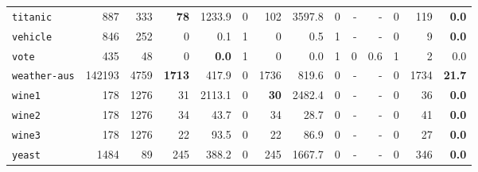 \begin{tabular}{lccrrrrrrrrrrr}
\texttt{titanic} & \multicolumn{1}{r}{887} & \multicolumn{1}{r}{333}  & \textbf{78} & 1233.9 & 0 & 102 & 3597.8 & 0 & - & - & 0 & 119 & \textbf{0.0}\\
\texttt{vehicle} & \multicolumn{1}{r}{846} & \multicolumn{1}{r}{252}  & 0 & 0.1 & 1 & 0 & 0.5 & 1 & - & - & 0 & 9 & \textbf{0.0}\\
\texttt{vote} & \multicolumn{1}{r}{435} & \multicolumn{1}{r}{48}  & 0 & \textbf{0.0} & 1 & 0 & 0.0 & 1 & 0 & 0.6 & 1 & 2 & 0.0\\
\texttt{weather-aus} & \multicolumn{1}{r}{142193} & \multicolumn{1}{r}{4759}  & \textbf{1713} & 417.9 & 0 & 1736 & 819.6 & 0 & - & - & 0 & 1734 & \textbf{21.7}\\
\texttt{wine1} & \multicolumn{1}{r}{178} & \multicolumn{1}{r}{1276}  & 31 & 2113.1 & 0 & \textbf{30} & 2482.4 & 0 & - & - & 0 & 36 & \textbf{0.0}\\
\texttt{wine2} & \multicolumn{1}{r}{178} & \multicolumn{1}{r}{1276}  & 34 & 43.7 & 0 & 34 & 28.7 & 0 & - & - & 0 & 41 & \textbf{0.0}\\
\texttt{wine3} & \multicolumn{1}{r}{178} & \multicolumn{1}{r}{1276}  & 22 & 93.5 & 0 & 22 & 86.9 & 0 & - & - & 0 & 27 & \textbf{0.0}\\
\texttt{yeast} & \multicolumn{1}{r}{1484} & \multicolumn{1}{r}{89}  & 245 & 388.2 & 0 & 245 & 1667.7 & 0 & - & - & 0 & 346 & \textbf{0.0}\\
\bottomrule
\end{tabular}
